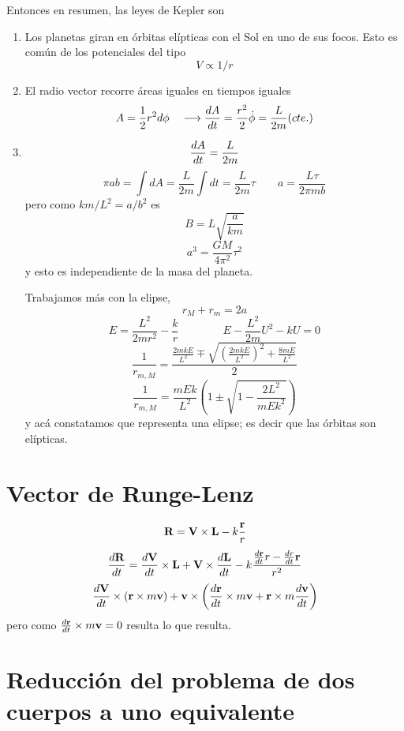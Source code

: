 \documentclass[10pt,oneside]{CBFT_book}
\begin{document}
Entonces en resumen, las leyes de Kepler son
\begin{enumerate}
 \item Los planetas giran en órbitas elípticas con el Sol en uno de sus focos. Esto es común de los potenciales del tipo 
	\[
		V \propto 1/r
	\]
 \item El radio vector recorre áreas iguales en tiempos iguales
	\[
		A = \frac{1}{2} r^2 d\phi \quad \longrightarrow \frac{d^{\hspace{-0.05em}} {A}}{d {t}^{\hspace{-0.05em}}} = \frac{r^2}{2} \dot{\phi} = \frac{L}{2m} (cte.)
	\]
 \item 
 \[
	\frac{d^{\hspace{-0.05em}} {A}}{d {t}^{\hspace{-0.05em}}} = \frac{L}{2m}
 \]
 \[
	\pi a b = \int dA = \frac{L}{2m} \int dt = \frac{L}{2m} \tau \qquad a = \frac{L\tau}{2\pi m b} 
 \]
 pero como $km/L^2 = a/b^2$ es
 \[
	B = L \sqrt{\frac{a}{k m}}
 \]
 \[
	a^3 = \frac{GM}{4\pi^2} \tau^2
 \]
 y esto es independiente de la masa del planeta.
 
 Trabajamos más con la elipse,
 \[
	r_M + r_m = 2a
 \]
 \[
	E = \frac{L^2}{2mr^2} - \frac{k}{r}	\qquad\qquad E - \frac{L^2}{2m} U^2 - kU = 0
 \]
 \[
	\frac{1}{r_{m,M}} = \frac{ \frac{2mkE}{L^2} \mp \sqrt{ \left(\frac{2mkE}{L^2}\right)^2 + \frac{8mE}{L^2} } }{2}
 \]
 \[
	\frac{1}{r_{m,M}} = \frac{mEk}{L^2} \left( 1 \pm \sqrt{1 - \frac{2L^2}{mEk^2}}\right) 
 \]
 y acá constatamos que representa una elipse; es decir que las órbitas son elípticas.
\end{enumerate}

\section{Vector de Runge-Lenz}

\[
	\vb{R} = \vb{V} \times \vb{L} - k\frac{\vb{r}}{r}
\]
\[
	\dtot{\vb{R}}{t} = \dtot{\vb{V}}{t} \times \vb{L} + \vb{V} \times \dtot{\vb{L}}{t} -
	k\frac{\dtot{\vb{r}}{t} r - \dtot{r}{t} \vb{r}  }{r^2}
\]
\[
	\dtot{\vb{V}}{t} \times ( \vb{r} \times m\vb{v} ) +
	\vb{v} \times \left( \dtot{\vb{r}}{t} \times m\vb{v} + \vb{r} \times m\dtot{\vb{v}}{t} \right)
\]
pero como $\dtot{\vb{r}}{t} \times m\vb{v} = 0$ resulta lo que resulta.

\section{Reducción del problema de dos cuerpos a uno equivalente}
\end{document}
